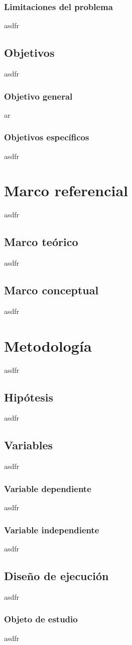 \documentclass{report}
\begin{document}
\subsection{Limitaciones del problema}
asdfr
\section{Objetivos}
asdfr
\subsection{Objetivo general}
ar
\subsection{Objetivos específicos}
asdfr
\chapter{Marco referencial}
asdfr
\section{Marco teórico}
asdfr
\section{Marco conceptual}
asdfr
\chapter{Metodología}
asdfr
\section{Hipótesis}
asdfr
\section{Variables}
asdfr
\subsection{Variable dependiente}
asdfr
\subsection{Variable independiente}
asdfr
\section{Diseño de ejecución}
asdfr
\subsection{Objeto de estudio}
asdfr
\end{document}
